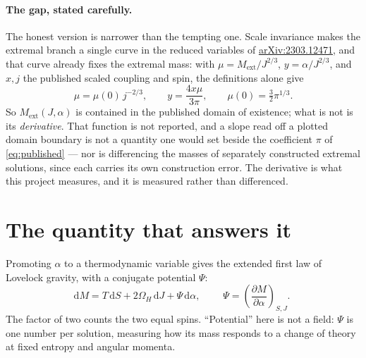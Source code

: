 \documentclass[10pt,a4paper]{article}
\newcommand{\ext}{\mathrm{ext}}
\newcommand{\dd}{\mathrm{d}}
\newcommand{\aX}[1]{\href{https://arxiv.org/abs/#1}{arXiv:#1}}
\begin{document}
\paragraph{The gap, stated carefully.}
The honest version is narrower than the tempting one. Scale invariance makes
the extremal branch a single curve in the
reduced variables of \aX{2303.12471}, and that curve already fixes the extremal
mass: with $\mu=M_\ext/J^{2/3}$, $y=\alpha/J^{2/3}$, and $x,j$ the published
scaled coupling and spin, the definitions alone give
\begin{equation}
 \mu=\mu(0)\,j^{-2/3},\qquad y=\frac{4x\mu}{3\pi},
 \qquad \mu(0)=\tfrac32\pi^{1/3}.
 \label{eq:dictionary}
\end{equation}
So $M_\ext(J,\alpha)$ is contained in the published domain of existence; what is
not is its \emph{derivative}. That function is not reported, and a slope read off
a plotted domain boundary is not a quantity one would set beside the coefficient
$\pi$ of \eqref{eq:published} --- nor is differencing the masses of separately
constructed extremal solutions, since each carries its own construction error.
The derivative is what this project measures, and it is measured rather than
differenced.

\section*{The quantity that answers it}

Promoting $\alpha$ to a thermodynamic variable gives the extended first law of
Lovelock gravity, with a conjugate potential $\Psi$:
\begin{equation}
 \dd M=T\,\dd S+2\Omega_H\,\dd J+\Psi\,\dd\alpha,
 \qquad
 \boxed{\;\Psi=\left(\frac{\partial M}{\partial\alpha}\right)_{S,J}.\;}
 \label{eq:firstlaw}
\end{equation}
The factor of two counts the two equal spins. ``Potential'' here is not a field:
$\Psi$ is one number per solution, measuring how its mass responds to a change
of theory at fixed entropy and angular momenta.
\end{document}
